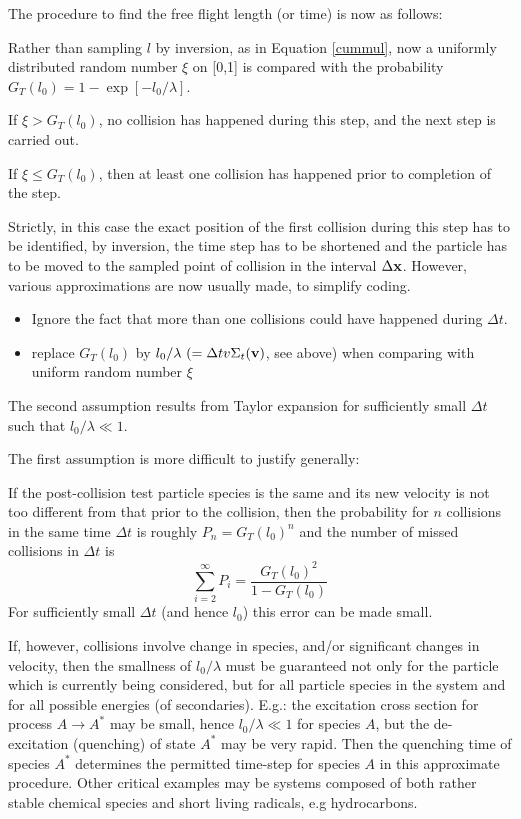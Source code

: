 The procedure to find the free flight length (or time) is now as follows:

Rather than sampling $l$ by inversion, as in Equation \cref{cummul}, now a
uniformly distributed random number $\xi$ on [0,1] is compared with the
probability $G_T(l_0) = 1-\exp[-l_0/\lambda]$.

If $\xi > G_T(l_0)$, no collision has happened during this step, and the next
step is carried out.

If $\xi \le G_T(l_0)$, then at least one collision has happened prior to
completion of the step.

Strictly, in this case the exact position of the first collision during this
step has to be identified, by inversion, the time step has to be shortened and
the particle has to be moved to the sampled point of collision in the interval
$\Delta \mathbf{x}$.
However, various approximations are now usually made, to simplify coding.
\begin{itemize}
  \item Ignore the fact that more than one collisions could have happened during
        $\Delta t$.
  \item replace $G_T(l_0)$ by $l_0/\lambda ~ (= \Delta t v \Sigma_t(\mathbf{v})$, see
        above) when comparing with uniform random number $\xi$
\end{itemize}
The second
assumption results from Taylor expansion for sufficiently small $\Delta t$ such
that $l_0/\lambda \ll 1$.

The first assumption is more difficult to justify generally:

If the post-collision test particle species is the same  and its new velocity
is not too different from that prior to the collision, then the probability for
$n$ collisions in the same time $\Delta t$ is roughly $P_n=G_T(l_0)^n$ and the
number of missed collisions in $\Delta t$ is
\begin{equation}
  \sum_{i=2}^\infty
  P_i = \frac{G_T(l_0)^2}{1-G_T(l_0)}
\end{equation}
For sufficiently small
$\Delta t$ (and hence $l_0$) this error can be made small.

If, however, collisions involve change in species, and/or significant changes
in velocity, then the smallness of $l_0/\lambda$ must be guaranteed not only
for the particle which is currently being considered, but for all particle
species in the system and for all possible energies (of secondaries).
E.g.: the excitation cross section for process $A  \rightarrow A^*$ may be
small, hence $l_0/\lambda \ll 1$ for species $A$, but the de-excitation
(quenching) of state $A^*$ may be very rapid.
Then the quenching time of species $A^*$ determines the permitted time-step for
species $A$ in this approximate procedure.
Other critical examples may be systems composed of both rather stable chemical
species and short living radicals, e.g hydrocarbons.

